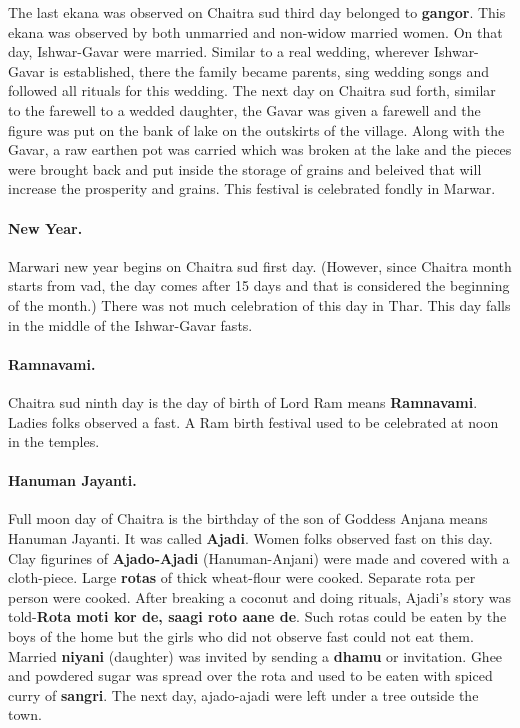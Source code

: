 The last ekana was observed on Chaitra sud third day belonged to
\textbf{gangor}. This ekana was observed by both unmarried and non-widow married
women. On that day, Ishwar-Gavar were married. Similar to a real wedding,
wherever Ishwar-Gavar is established, there the family became parents, sing
wedding songs and followed all rituals for this wedding. The next day on Chaitra
sud forth, similar to the farewell to a wedded daughter, the Gavar was given a
farewell and the figure was put on the bank of lake on the outskirts of the
village. Along with the Gavar, a raw earthen pot was carried which was broken at
the lake and the pieces were brought back and put inside the storage of grains
and beleived that will increase the prosperity and grains. This festival is
celebrated fondly in Marwar.

\paragraph{New Year.} Marwari new year begins on Chaitra sud first day.
(However, since Chaitra month starts from vad, the day comes after 15 days and
that is considered the beginning of the month.) There was not much celebration
of  this day in Thar. This day falls in the middle of the Ishwar-Gavar fasts.

\paragraph{Ramnavami.} Chaitra sud ninth day is the day of birth of Lord Ram
means \textbf{Ramnavami}. Ladies folks observed a fast. A Ram birth festival
used to be celebrated at noon in the temples.
\paragraph{Hanuman Jayanti.}
Full moon day of Chaitra is the birthday of the son of Goddess Anjana means
Hanuman Jayanti. It was called \textbf{Ajadi}. Women folks observed fast on
this day. Clay figurines of \textbf{Ajado-Ajadi} (Hanuman-Anjani) were made and
covered with a cloth-piece. Large \textbf{rotas} of thick wheat-flour were
cooked. Separate rota per person were cooked. After breaking a coconut and
doing rituals, Ajadi's story was told-\textbf{Rota moti kor de, saagi roto aane
de}. Such rotas could be eaten by the boys of the home but the girls who did
not observe fast could not eat them. Married \textbf{niyani} (daughter) was
invited by sending a \textbf{dhamu} or invitation. Ghee and powdered sugar was
spread over the rota and used to be eaten with spiced curry of \textbf{sangri}.
The next day, ajado-ajadi were left under a tree outside the town.

